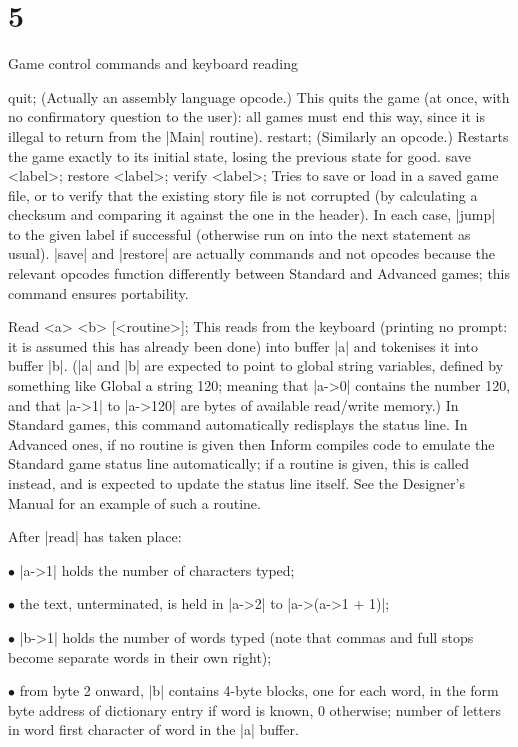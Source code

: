 \section{5}{Game control commands and keyboard reading}

\beginstt
quit;
\endtt
(Actually an assembly language opcode.)  This quits the game
(at once, with no confirmatory question to the user): all games must
end this way, since it is illegal to return from the |Main| routine).
\beginstt
restart;
\endtt
(Similarly an opcode.)  Restarts the game exactly to its initial state,
losing the previous state for good.
\beginstt
save <label>;
restore <label>;
verify <label>;
\endtt
Tries to save or load in a saved game file, or to verify that the
existing story file is not corrupted (by calculating a checksum and
comparing it against the one in the header).  In each case, |jump|
to the given label if successful (otherwise run on into the next
statement as usual).  |save| and |restore| are actually commands and
not opcodes because the relevant opcodes function differently between
Standard and Advanced games; this command ensures portability.

\bigskip
\beginstt
Read <a> <b> [<routine>];
\endtt
This reads from the keyboard (printing no prompt: it is assumed this
has already been done) into buffer |a| and tokenises it into buffer |b|.
(|a| and |b| are expected to point to global string variables, defined
by something like
\beginstt
Global a string 120;
\endtt
meaning that |a->0| contains the number 120, and that |a->1| to
|a->120| are bytes of available read/write memory.)  In Standard games,
this command automatically redisplays the status line.  In Advanced ones,
if no routine is given then Inform compiles code to emulate the
Standard game status line automatically; if a routine is given, this
is called instead, and is expected to update the status line itself.
See the Designer's Manual for an example of such a routine.

\noindent After |read| has taken place:
\item{$\bullet$} |a->1| holds the number of characters typed;
\item{$\bullet$} the text, unterminated, is held in |a->2| to |a->(a->1 + 1)|;
\item{$\bullet$} |b->1| holds the number of words typed (note that commas
and full stops become separate words in their own right);
\item{$\bullet$} from byte 2 onward, |b| contains 4-byte blocks, one for
each word, in the form
 byte address of dictionary entry if word is known, 0 otherwise;
 number of letters in word
 first character of word in the |a| buffer.

